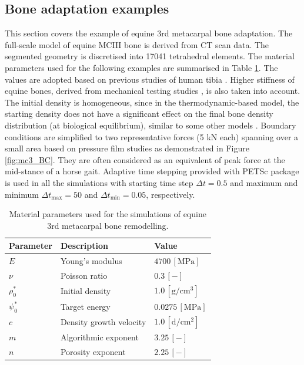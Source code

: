 \documentclass[11pt]{ACMEarticle}
\numberwithin{equation}{section}
\begin{document}
\subsection{Bone adaptation examples}
\label{sec:numerical_examples:bone_adap}
This section covers the example of equine 3rd metacarpal bone adaptation. The full-scale model of equine MCIII bone is derived from CT scan data. The segmented geometry is discretised into 17041 tetrahedral elements. The material parameters used for the following examples are summarised in Table \ref{tab:parameters_mc3}. The values are adopted based on previous studies of human tibia \citep{Pang2012,Waffenschmidt2012}. Higher stiffness of equine bones, derived from mechanical testing studies \citep{Les1994}, is also taken into account. The initial density is homogeneous, since in the thermodynamic-based model, the starting density does not have a significant effect on the final bone density distribution (at biological equilibrium), similar to some other models \citep{kuhl2003theory}. %
Boundary conditions are simplified to two representative forces (5 kN each) spanning over a small area based on pressure film studies \citep{Brama2001} as demonstrated in Figure \ref{fig:mc3_BC}. They are often considered as an equivalent of peak force at the mid-stance of a horse gait. %
Adaptive time stepping provided with PETSc package \citep{petsc-web} is used in all the simulations with starting time step $\Delta t = 0.5$ and maximum and minimum $\Delta t_{\text {max}} = 50$ and $\Delta t_{\text {min}} = 0.05$, respectively.
\begin{table}[h]
	\centering
	\begin{tabular}{lll}
		\hline
		Parameter             & Description                  & Value  \\ \hline
		$E  $                 & Young's modulus              & $4700 \,\mathrm{ [MPa]}$  \citep{Les1994} \\
		$\nu  $               & Poisson ratio                & $0.3 \,\mathrm{ [-]}$ \\
		$\rho_0 ^\ast  $      & Initial density              & $1.0 \,\mathrm{[ g/cm^{3}]}$  \\
		$\psi_{0}^\ast $      & Target energy                & $0.0275\,\mathrm{ [MPa]}$   \citep{Waffenschmidt2012}  \\
		$c$                   & Density growth velocity      & $1.0 \,\mathrm{ [d/cm^{2}]}$   \\
		$m$                   & Algorithmic exponent         & $ 3.25 \,\mathrm{ [-]}$          \\
		$n$                   & Porosity exponent            & $2.25 \,\mathrm{ [-]}$      \citep{Les1994}   \\ 
		\hline
	\end{tabular} 
	\caption{Material parameters used for the simulations of equine 3rd metacarpal bone remodelling.}
	\label{tab:parameters_mc3}
\end{table}
\end{document}
